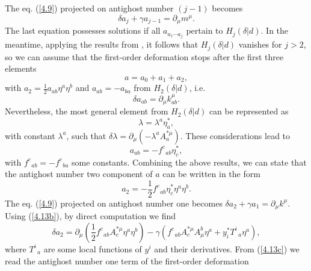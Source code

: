 \documentclass[a4paper,12pt]{article}
\begin{document}
The eq. (\ref{4.9}) projected on antighost
number $\left( j-1\right) $
becomes
\begin{equation}
\delta a_{j}+\gamma a_{j-1}=
\partial _{\mu }m^{\mu }.  \label{4.10a}
\end{equation}
The last equation possesses solutions if all
$a_{a_{1}\cdots a_{j}}$ pertain
to $H_{j}\left( \delta |d\right) $.
In the meantime, applying the results
from \cite{20}, it follows that
$H_{j}\left( \delta |d\right) $ vanishes for
$j>2$, so we can assume that the
first-order deformation stops after the
first three elements
\begin{equation}
a=a_{0}+a_{1}+a_{2},  \label{4.11}
\end{equation}
with $a_{2}=\frac{1}{2}a_{ab}\eta ^{a}\eta ^{b}$ and
$a_{ab}=-a_{ba}$ from $%
H_{2}\left( \delta |d\right) $, i.e.
\begin{equation}
\delta a_{ab}=\partial _{\mu }k_{ab}^{\mu }.  \label{4.12}
\end{equation}
Nevertheless, the most general element from
$H_{2}\left( \delta |d\right) $
can be represented as
\begin{equation}
\lambda =\lambda ^{a}\eta _{a}^{*},  \label{4.13}
\end{equation}
with constant $\lambda ^{a}$, such that
$\delta \lambda =\partial _{\mu
}\left( -\lambda ^{a}A_{a}^{*\mu }\right) $.
These considerations lead to
\begin{equation}
a_{ab}=-f_{\;\;ab}^{c}\eta _{c}^{*},  \label{4.13a}
\end{equation}
with $f_{\;\;ab}^{c}=-f_{\;\;ba}^{c}$ some constants.
Combining the above
results, we can state that the antighost
number two component of $a$ can be
written in the form
\begin{equation}
a_{2}=-\frac{1}{2}f_{\;\;ab}^{c}
\eta _{c}^{*}\eta ^{a}\eta ^{b}.
\label{4.13b}
\end{equation}
The eq. (\ref{4.9}) projected on antighost
number one becomes $\delta
a_{2}+\gamma a_{1}=\partial _{\mu }k^{\mu }$.
Using (\ref{4.13b}), by direct
computation we find
\begin{equation}
\delta a_{2}=\partial _{\mu }\left(
\frac{1}{2}f_{\;\;ab}^{c}A_{c}^{*\mu
}\eta ^{a}\eta ^{b}\right) -\gamma
\left( f_{\;\;ab}^{c}A_{c}^{*\mu }A_{\mu
}^{b}\eta ^{a}+y_{i}^{*}T_{\;\;a}^{i}
\eta ^{a}\right) ,  \label{4.13c}
\end{equation}
where $T_{\;\;a}^{i}$ are some local
functions of $y^{i}$ and their
derivatives. From (\ref{4.13c}) we read
the antighost number one term of the
first-order deformation
\end{document}
